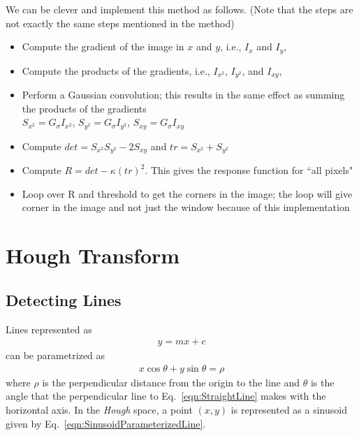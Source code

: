 \documentclass{report}
\begin{document}
We can be clever and implement this method as follows. (Note that the steps are not exactly the same steps mentioned in the method)
\begin{itemize}
	\item Compute the gradient of the image in $x$ and $y$, i.e., $I_{x}$ and $I_{y}$,
	\item Compute the products of the gradients, i.e., $I_{x^2}$, $I_{y^2}$, and $I_{xy}$,
	\item Perform a Gaussian convolution; this results in the same effect as summing the products of the gradients\\
		$S_{x^2}= G_{\sigma} I_{x^2}$, $S_{y^2}= G_{\sigma} I_{y^2}$, $S_{xy}= G_{\sigma} I_{xy}$
	\item Compute $det = S_{x^2} S_{y^2} - 2 S_{xy}$ and $tr = S_{x^2} + S_{y^2}$
	\item Compute $R = det - \kappa (tr)^2$. This gives the response function for ``all pixels"
	\item Loop over R and threshold to get the corners in the image; the loop will give corner in the image and not just the window because of this implementation
\end{itemize}





\section{Hough Transform}
\subsection{Detecting Lines}
\hspace{\parindent}Lines represented as 
\begin{align}
	y = mx + c
	\label{eqn:StraightLine}
\end{align}
can be parametrized as
\begin{align}
	x \cos{\theta} + y \sin{\theta} = \rho
	\label{eqn:SinusoidParameterizedLine}
\end{align}
where $\rho$ is the perpendicular distance from the origin to the line and $\theta$ is the angle that the perpendicular line to Eq.~\ref{eqn:StraightLine} makes with the horizontal axis. In the \textit{Hough} space, a point $(x,y)$ is represented as a sinusoid given by Eq.~\ref{eqn:SinusoidParameterizedLine}.
\end{document}
